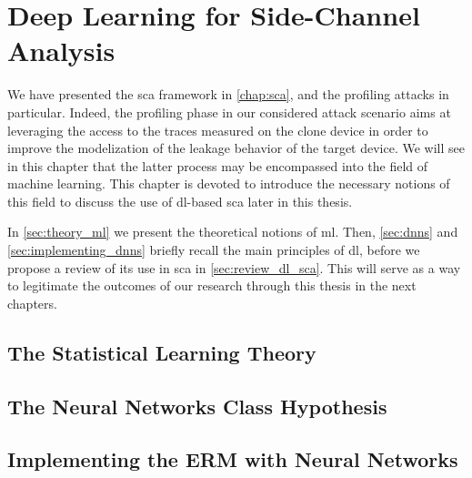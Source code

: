\chapter{Deep Learning for Side-Channel Analysis}
\label{chap:machine_learning}
\minitoc
\newpage
We have presented the \gls{sca} framework in \autoref{chap:sca}, and the profiling attacks in particular.
Indeed, the profiling phase in our considered attack scenario aims at leveraging the access to the traces measured on the clone device in order to improve the modelization of the leakage behavior of the target device.
We will see in this chapter that the latter process may be encompassed into the field of machine learning.
This chapter is devoted to introduce the necessary notions of this field to discuss the use of \gls{dl}-based \gls{sca} later in this thesis.

In \autoref{sec:theory_ml} we present the theoretical notions of \gls{ml}.
Then, \autoref{sec:dnns} and \autoref{sec:implementing_dnns} briefly recall the main principles of \gls{dl}, before we propose a review of its use in \gls{sca} in \autoref{sec:review_dl_sca}.
This will serve as a way to legitimate the outcomes of our research through this thesis in the next chapters.

\section{The Statistical Learning Theory}
    \label{sec:theory_ml}
    

\section{The Neural Networks Class Hypothesis}
    \label{sec:dnns}
    

\section{Implementing the ERM with Neural Networks}
    \label{sec:implementing_dnns}
    

